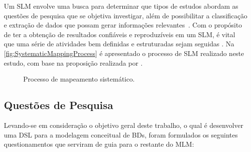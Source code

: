 Um \ac{SLM} envolve uma busca para determinar que tipos de estudos abordam as questões de pesquisa que se objetiva investigar, além de possibilitar a classificação e extração de dados que possam gerar informações relevantes~\cite{Bailey:2007}. 
Com o propósito de ter a obtenção de resultados confiáveis e reproduzíveis em um \ac{SLM}, é vital que uma série de atividades bem definidas e estruturadas sejam seguidas \cite{Nakagawa:2017}. 
Na \autoref{fig:SystematicMappingProcess} é apresentado o processo de \ac{SLM} realizado neste estudo, com base na proposição realizada por . %

\begin{figure}[htb]
	\centering
	\caption{Processo de mapeamento sistemático.}
		
	\label{fig:SystematicMappingProcess}
\end{figure}

    \subsection{Questões de Pesquisa} \label{ssec:QPs}

Levando-se em consideração o objetivo geral deste trabalho, o qual é desenvolver uma \ac{DSL} para a modelagem conceitual de \acp{BD}, foram formulados os seguintes questionamentos que serviram de guia para o restante do \ac{MLM}:


